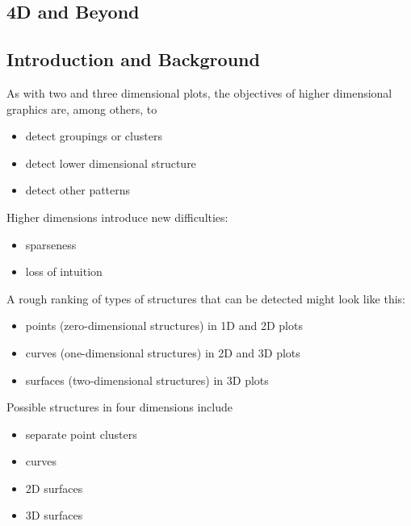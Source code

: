 \begin{slide}{}
\section{4D and Beyond}
\subsection{Introduction and Background}
As with two and three dimensional plots, the objectives of
higher dimensional graphics are, among others, to
\begin{itemize}
\item detect groupings or clusters
\item detect lower dimensional structure
\item detect other patterns
\end{itemize}
Higher dimensions introduce new difficulties:
\begin{itemize}
\item sparseness
\item loss of intuition
\end{itemize}
\end{slide}

\begin{slide}{}
A rough ranking of types of structures that can be detected might
look like this:
\begin{itemize}
\item points (zero-dimensional structures) in 1D and 2D plots
\item curves (one-dimensional structures) in 2D and 3D plots
\item surfaces (two-dimensional structures) in 3D plots
\end{itemize}
Possible structures in four dimensions include
\begin{itemize}
\item separate point clusters
\item curves
\item 2D surfaces
\item 3D surfaces
\end{itemize}
\end{slide}

